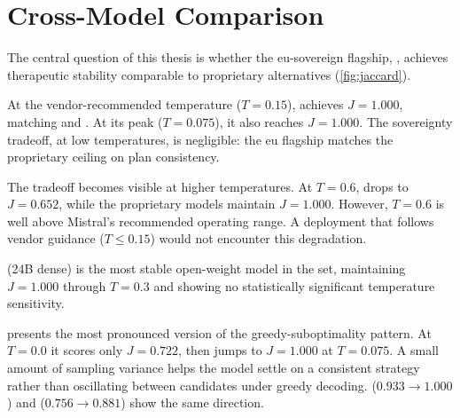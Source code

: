 \section{Cross-Model Comparison}
\label{sec:disc-models}

The central question of this thesis is whether the \gls{eu}-sovereign
flagship, , achieves therapeutic stability
comparable to proprietary alternatives (\autoref{fig:jaccard}).

At the vendor-recommended temperature ($T = 0.15$),
 achieves $J = 1.000$, matching
 and . At its peak ($T = 0.075$),
it also reaches $J = 1.000$. The sovereignty tradeoff, at low
temperatures, is negligible: the \gls{eu} flagship matches the proprietary
ceiling on plan consistency.

The tradeoff becomes visible at higher temperatures. At $T = 0.6$,
 drops to $J = 0.652$, while the proprietary
models maintain $J = 1.000$. However, $T = 0.6$ is well above Mistral's
recommended operating range. A deployment that follows vendor guidance
($T \leq 0.15$) would not encounter this degradation.

 (24B dense) is the most stable open-weight
model in the set, maintaining $J = 1.000$ through $T = 0.3$ and showing no
statistically significant temperature sensitivity.

 presents the most pronounced version of the
greedy-suboptimality pattern. At $T = 0.0$ it scores only $J = 0.722$,
then jumps to $J = 1.000$ at $T = 0.075$. A small amount of sampling
variance helps the model settle on a consistent strategy rather than
oscillating between candidates under greedy decoding.
 ($0.933 \to 1.000$) and
 ($0.756 \to 0.881$) show the same direction.

